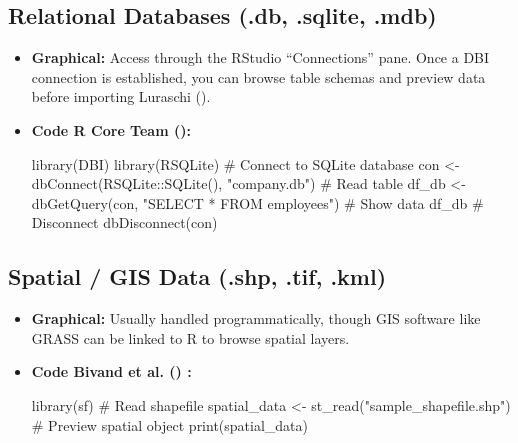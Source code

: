 \documentclass[
  doc,
  longtable,
  a4paper,
  nolmodern,
  notxfonts,
  notimes,
  colorlinks=true,linkcolor=blue,citecolor=blue,urlcolor=blue]{apa7}
\newenvironment{Shaded}{\begin{snugshade}}{\end{snugshade}}
\newcommand{\CommentTok}[1]{\textcolor[rgb]{0.37,0.37,0.37}{#1}}
\newcommand{\FunctionTok}[1]{\textcolor[rgb]{0.28,0.35,0.67}{#1}}
\newcommand{\NormalTok}[1]{\textcolor[rgb]{0.00,0.23,0.31}{#1}}
\newcommand{\OtherTok}[1]{\textcolor[rgb]{0.00,0.23,0.31}{#1}}
\newcommand{\SpecialCharTok}[1]{\textcolor[rgb]{0.37,0.37,0.37}{#1}}
\newcommand{\StringTok}[1]{\textcolor[rgb]{0.13,0.47,0.30}{#1}}
\begin{document}
\subsection{Relational Databases (.db, .sqlite,
.mdb)}\label{relational-databases-.db-.sqlite-.mdb}

\begin{itemize}
\item
  \textbf{Graphical:} Access through the RStudio ``Connections'' pane.
  Once a DBI connection is established, you can browse table schemas and
  preview data before importing Luraschi
  ().
\item
  \textbf{Code R Core Team ():}

\begin{Shaded}
\begin{Highlighting}[]
\FunctionTok{library}\NormalTok{(DBI)}
\FunctionTok{library}\NormalTok{(RSQLite)}
\CommentTok{\# Connect to SQLite database}
\NormalTok{con }\OtherTok{\textless{}{-}} \FunctionTok{dbConnect}\NormalTok{(RSQLite}\SpecialCharTok{::}\FunctionTok{SQLite}\NormalTok{(), }\StringTok{"company.db"}\NormalTok{)}
\CommentTok{\# Read table}
\NormalTok{df\_db }\OtherTok{\textless{}{-}} \FunctionTok{dbGetQuery}\NormalTok{(con, }\StringTok{"SELECT * FROM employees"}\NormalTok{)}
\CommentTok{\# Show data}
\NormalTok{df\_db}
\CommentTok{\# Disconnect}
\FunctionTok{dbDisconnect}\NormalTok{(con)}
\end{Highlighting}
\end{Shaded}
\end{itemize}

\subsection{Spatial / GIS Data (.shp, .tif,
.kml)}\label{spatial-gis-data-.shp-.tif-.kml}

\begin{itemize}
\item
  \textbf{Graphical:} Usually handled programmatically, though GIS
  software like GRASS can be linked to R to browse spatial layers.
\item
  \textbf{Code Bivand et al. () :}

\begin{Shaded}
\begin{Highlighting}[]
\FunctionTok{library}\NormalTok{(sf)}
\CommentTok{\# Read shapefile}
\NormalTok{spatial\_data }\OtherTok{\textless{}{-}} \FunctionTok{st\_read}\NormalTok{(}\StringTok{"sample\_shapefile.shp"}\NormalTok{)}
\CommentTok{\# Preview spatial object}
\FunctionTok{print}\NormalTok{(spatial\_data)}
\end{Highlighting}
\end{Shaded}
\end{itemize}
\end{document}
